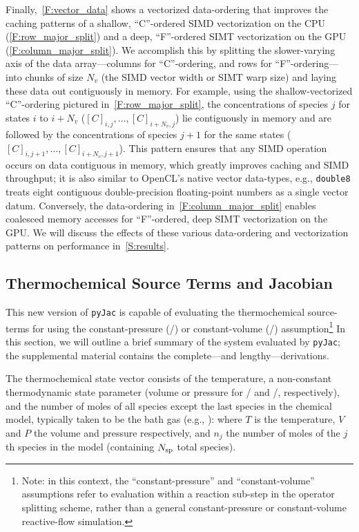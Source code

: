 \documentclass[12pt,number,sort&compress,preprint]{elsarticle}
\newcommand{\revise}[1]{{\sloppy\textcolor{RoyalPurple}{#1}}}  %
\begin{document}
Finally,~\cref{F:vector_data} shows a vectorized data-ordering that improves the caching patterns of a shallow, ``C''-ordered SIMD vectorization on the CPU (\cref{F:row_major_split}) and a deep, ``F''-ordered SIMT vectorization on the GPU (\cref{F:column_major_split}).
\revise{We accomplish this} by splitting the slower-varying axis of the data array---columns for ``C''-ordering, and rows for ``F''-ordering---into chunks of size $N_v$ (the SIMD vector width or SIMT warp size) and laying these data out contiguously in memory.
For example, using the shallow-vectorized ``C''-ordering pictured in~\cref{F:row_major_split}, the concentrations of species $j$ for states $i$ to $i+N_v$ ($[C]_{i, j}, \ldots, [C]_{i + N_v, j}$) lie contiguously in memory and are followed by the concentrations of species $j + 1$ for the same states ($[C]_{i, j + 1}, \ldots, [C]_{i + N_v, j + 1}$).
This pattern ensures that any SIMD operation occurs on data contiguous in memory, which greatly improves caching and SIMD throughput;
\revise{it is also similar to OpenCL's native vector data-types, e.g., \texttt{double\num{8}} treats eight contiguous double-precision floating-point numbers as a single vector datum}.
Conversely, the data-ordering in~\cref{F:column_major_split} \revise{enables} coalesced memory accesses for ``F''-ordered, deep SIMT vectorization on the GPU.
\revise{We will discuss the} effects of these various data-ordering and vectorization patterns on performance in~\cref{S:results}.

\subsection{Thermochemical Source Terms and Jacobian}
This new version of \texttt{pyJac} is capable of evaluating the thermochemical source-terms for using the constant-pressure (\conp/) or constant-volume (\conv/) assumption\footnote{Note: in this context, the ``constant-pressure'' and ``constant-volume'' assumptions refer to evaluation within a reaction sub-step in the operator splitting scheme, rather than a general constant-pressure or constant-volume reactive-flow simulation.}
In this section, we will outline a brief summary of the system evaluated by \texttt{pyJac}; \revise{the supplemental material contains the complete---and lengthy---derivations}.


The thermochemical state vector consists of the temperature, a non-constant thermodynamic state parameter (volume or pressure for \conp/ and \conv/, respectively), and the number of moles of all species except the last species in the chemical model, typically taken to be the bath gas (e.g., ):
where $T$ is the temperature, $V$ and $P$ the volume and pressure respectively, and $n_j$ the number of moles of the $j$th species in the model (containing $\ns/$ total species).
\end{document}
